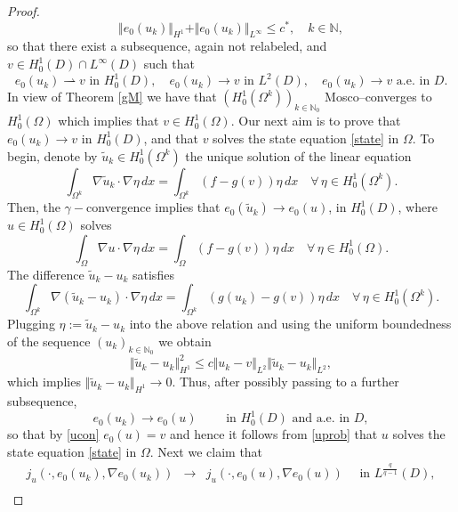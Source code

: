 \documentclass[a4paper,10pt]{article}
\newcommand{\dx}{\,dx}
\theoremstyle{plain}
\theoremstyle{plain}
\numberwithin{equation}{section}
\begin{document}
\begin{proof}
\begin{equation} \label{bounds}
\Vert e_0(u_k) \Vert_{H^1} + \Vert e_0(u_k) \Vert_{L^\infty} \leq c^*, \quad k \in \mathbb N,
\end{equation}
so that there exist a subsequence, again not relabeled, and $v \in H^1_0(D) \cap L^\infty(D)$ such that
\begin{equation}\label{ucon}
e_0(u_k)  \rightharpoonup v \text{ in } H^1_0(D), \quad e_0(u_k)  \rightarrow v \text{ in } L^2(D), \quad
e_0(u_k) \rightarrow v \text{ a.e. in } D.
\end{equation}
In view of Theorem \ref{gM} we have that $(H^1_0(\Omega^k))_{k \in \mathbb N_0}$ Mosco--converges to $H^1_0(\Omega)$
which  implies that  $v \in H^1_0(\Omega)$. Our next aim is to prove that  $e_0(u_k) \rightarrow v$  in $H^1_0(D)$, and that $v$ solves the state equation \eqref{state} in $\Omega$. To begin, denote by $\tilde u_k \in H^1_0(\Omega^k)$ the unique solution of the linear equation 
\[
\int_{\Omega^k} \nabla \tilde u_k \cdot \nabla \eta \dx = \int_{\Omega^k} (f-g(v))\eta \dx \quad \forall \, \eta \in H^1_0(\Omega^k).
\]
Then, the $\gamma-$convergence implies that $e_0(\tilde u_k) \rightarrow e_0(u)$, 
in $H^1_0(D)$, where $u \in H^1_0(\Omega)$ solves
\begin{equation}\label{uprob}
\int_{\Omega} \nabla u \cdot \nabla \eta \dx = \int_{\Omega} (f-g(v))\eta \dx \quad \forall \, \eta \in H^1_0(\Omega).
\end{equation}
The difference $\tilde u_k-u_k$ satisfies
\[
\int_{\Omega^k} \nabla (\tilde u_k-u_k)\cdot \nabla \eta \dx = \int_{\Omega^k} (g(u_k)-g(v))\eta \dx \quad \forall \, \eta \in H^1_0(\Omega^k).
\]
Plugging  $\eta := \tilde u_k-u_k$ into the above relation 
and using the uniform boundedness of the sequence 
$(u_k)_{k \in \mathbb N_0}$ we obtain
\[
\Vert \tilde u_k-u_k\Vert_{H^1}^2 \le c \Vert u_k-v\Vert_{L^2}\Vert\tilde u_k-u_k\Vert_{L^2},
\]
which implies $\Vert \tilde u_k-u_k\Vert_{H^1} \rightarrow 0$. Thus, after possibly passing
to a further subsequence,
\begin{equation} \label{eq:limit1}
 e_0(u_k) \rightarrow e_0(u) \qquad \mbox{ in }  H^1_0(D) \mbox{ and a.e. in } D,
\end{equation}
so that by \eqref{ucon} $e_0(u)=v$ and hence it follows from \eqref{uprob} that $u$ solves the state equation \eqref{state}
in $\Omega$. 
Next we claim that 
\begin{eqnarray}
j_u(\cdot,e_0(u_k),\nabla e_0(u_k)) &\rightarrow & j_u(\cdot,e_0(u), \nabla e_0(u)) \quad \mbox{ in } L^{\frac{q}{q-1}}(D), \label{convph1} \\

\end{eqnarray}
\end{proof}
\end{document}
